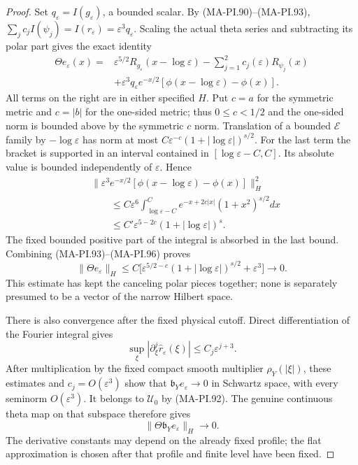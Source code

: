 \begin{proof}
Set $q_\varepsilon=I(g_\varepsilon)$, a bounded scalar.
By (MA-PI.90)--(MA-PI.93),
$\sum_j c_jI(\psi_j)=I(r_\varepsilon)=\varepsilon^3q_\varepsilon$.
Scaling the actual theta series and subtracting its
polar part gives the exact identity
\[
 \begin{split}
 \Theta e_\varepsilon(x)
   ={}&\varepsilon^{5/2}R_{g_\varepsilon}(x-\log\varepsilon)
                      -\sum_{j=1}^2c_j(\varepsilon)R_{\psi_j}(x)\\
     &+\varepsilon^3q_\varepsilon e^{-x/2}
            [\phi(x-\log\varepsilon)-\phi(x)].
 \end{split}
 \tag{MA-PI.95}
\]
All terms on the right are in either specified $H$.
Put $c=a$ for the symmetric metric and $c=|b|$ for
the one-sided metric; thus $0\le c<1/2$ and the
one-sided norm is bounded above by the symmetric
$c$ norm. Translation of a bounded $\mathcal E$ family
by $-\log\varepsilon$ has norm at most
$C\varepsilon^{-c}(1+|\log\varepsilon|)^{s/2}$.
For the last term the bracket is supported in an
interval contained in $[\log\varepsilon-C,C]$.
Its absolute value is bounded independently of
$\varepsilon$. Hence
\[
 \begin{split}
 &\bigl\|\varepsilon^3e^{-x/2}
        [\phi(x-\log\varepsilon)-\phi(x)]\bigr\|_H^2\\
 &\qquad\le C\varepsilon^6
      \int_{\log\varepsilon-C}^{C}
           e^{-x+2c|x|}(1+x^2)^{s/2}dx\\
 &\qquad\le C'\varepsilon^{5-2c}
                          (1+|\log\varepsilon|)^s.
 \end{split}
 \tag{MA-PI.96}
\]
The fixed bounded positive part of the integral is
absorbed in the last bound. Combining (MA-PI.93)--(MA-PI.96)
proves
\[
 \|\Theta e_\varepsilon\|_H
   \le C\bigl[\varepsilon^{5/2-c}
                 (1+|\log\varepsilon|)^{s/2}+\varepsilon^3\bigr]
                                      \longrightarrow0.
 \tag{MA-PI.97}
\]
This estimate has kept the canceling polar pieces
together; none is separately presumed to be a vector
of the narrow Hilbert space.

There is also convergence after the fixed physical
cutoff. Direct differentiation of the Fourier integral gives
\[
 \sup_\xi|\partial_\xi^j\widehat r_\varepsilon(\xi)|
                         \le C_j\varepsilon^{j+3}.
 \tag{MA-PI.98}
\]
After multiplication by the fixed compact smooth
multiplier $\rho_Y(|\xi|)$, these estimates and
$c_j=O(\varepsilon^3)$ show that
$\mathfrak b_Y e_\varepsilon\to0$ in Schwartz space,
with every seminorm $O(\varepsilon^3)$. It belongs
to $\mathcal U_0$ by (MA-PI.92). The genuine continuous
theta map on that subspace therefore gives
\[
                 \|\Theta\mathfrak b_Ye_\varepsilon\|_H
                                      \longrightarrow0.
 \tag{MA-PI.99}
\]
The derivative constants may depend on the already
fixed profile; the flat approximation is chosen
after that profile and finite level have been fixed.


\end{proof}
